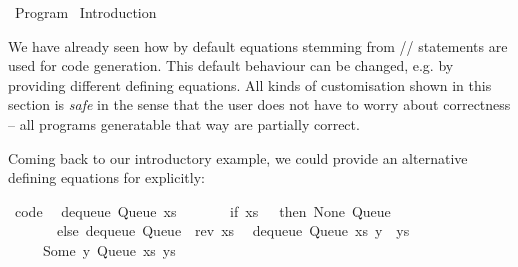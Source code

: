%
\begin{isabellebody}%
\def\isabellecontext{Program}%
%
\isadelimtheory
%
\endisadelimtheory
%
\isatagtheory
{}\isamarkupfalse%
\ Program\isanewline
{}\ Introduction\isanewline
{}%
\endisatagtheory
{\isafoldtheory}%
%
\isadelimtheory
%
\endisadelimtheory
%
\isamarkuptrue%
%
\isamarkuptrue%
%
\begin{isamarkuptext}%
We have already seen how by default equations stemming from
  \hyperlink{command.definition}{\mbox{}}/\hyperlink{command.primrec}{\mbox{}}/\hyperlink{command.fun}{\mbox{}}
  statements are used for code generation.  This default behaviour
  can be changed, e.g. by providing different defining equations.
  All kinds of customisation shown in this section is \emph{safe}
  in the sense that the user does not have to worry about
  correctness -- all programs generatable that way are partially
  correct.%
\end{isamarkuptext}%
\isamarkuptrue%
%
\isamarkuptrue%
%
\begin{isamarkuptext}%
Coming back to our introductory example, we
  could provide an alternative defining equations for 
  explicitly:%
\end{isamarkuptext}%
\isamarkuptrue%
%
\isadelimquote
%
\endisadelimquote
%
\isatagquote
{}\isamarkupfalse%
\ {\isacharbrackleft}code{\isacharbrackright}{\isacharcolon}\isanewline
\ \ {\isachardoublequoteopen}dequeue\ {\isacharparenleft}Queue\ xs\ {\isacharbrackleft}{\isacharbrackright}{\isacharparenright}\ {\isacharequal}\isanewline
\ \ \ \ \ {\isacharparenleft}if\ xs\ {\isacharequal}\ {\isacharbrackleft}{\isacharbrackright}\ then\ {\isacharparenleft}None{\isacharcomma}\ Queue\ {\isacharbrackleft}{\isacharbrackright}\ {\isacharbrackleft}{\isacharbrackright}{\isacharparenright}\isanewline
\ \ \ \ \ \ \ else\ dequeue\ {\isacharparenleft}Queue\ {\isacharbrackleft}{\isacharbrackright}\ {\isacharparenleft}rev\ xs{\isacharparenright}{\isacharparenright}{\isacharparenright}{\isachardoublequoteclose}\isanewline
\ \ {\isachardoublequoteopen}dequeue\ {\isacharparenleft}Queue\ xs\ {\isacharparenleft}y\ {\isacharhash}\ ys{\isacharparenright}{\isacharparenright}\ {\isacharequal}\isanewline
\ \ \ \ \ {\isacharparenleft}Some\ y{\isacharcomma}\ Queue\ xs\ ys{\isacharparenright}{\isachardoublequoteclose}\isanewline

\end{isabellebody}
